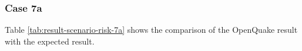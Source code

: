 \subsubsection{Case 7a}




Table \ref{tab:result-scenario-risk-7a} shows the comparison of the OpenQuake result with the expected result.

